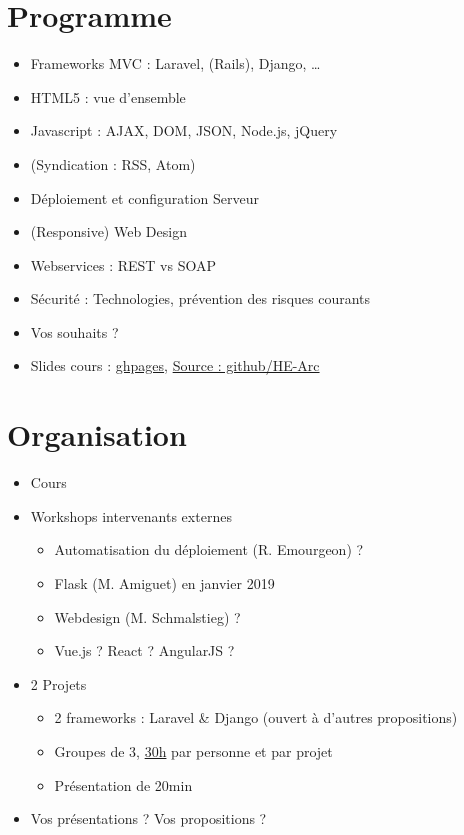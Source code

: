 \hypertarget{programme}{%
\section{Programme}\label{programme}}

\begin{itemize}
\tightlist
\item
  Frameworks MVC : Laravel, (Rails), Django, \ldots{}
\item
  HTML5 : vue d'ensemble
\item
  Javascript : AJAX, DOM, JSON, Node.js, jQuery
\item
  (Syndication : RSS, Atom)
\item
  Déploiement et configuration Serveur
\item
  (Responsive) Web Design
\item
  Webservices : REST vs SOAP
\item
  Sécurité : Technologies, prévention des risques courants
\item
  {Vos souhaits ?}
\item
  Slides cours :
  \href{https://he-arc.github.io/slides-devweb/}{ghpages},
  \href{https://github.com/HE-Arc/slides-devweb/tree/master/src}{Source
  : github/HE-Arc}
\end{itemize}

\hypertarget{organisation}{%
\section{Organisation}\label{organisation}}

\begin{itemize}
\tightlist
\item
  Cours
\item
  Workshops intervenants externes

  \begin{itemize}
  \tightlist
  \item
    Automatisation du déploiement (R. Emourgeon) ?
  \item
    Flask (M. Amiguet) en janvier 2019
  \item
    Webdesign (M. Schmalstieg) ?
  \item
    Vue.js ? React ? AngularJS ?
  \end{itemize}
\item
  2 Projets

  \begin{itemize}
  \tightlist
  \item
    2 frameworks : Laravel \& Django (ouvert à d'autres propositions)
  \item
    Groupes de 3,
    \href{https://www.he-arc.ch/sites/www.he-arc.ch/files/Reglements/04\%20Formation\%20de\%20base/43\%20Ing\%C3\%A9nierie/430.100\%20Descriptifs\%20de\%20modules\%20Informatique/RS430.100.18.3255\%20Technologies\%20d'interaction.pdf}{30h}
    par personne et par projet
  \item
    Présentation de 20min
  \end{itemize}
\item
  Vos présentations ? {Vos propositions ?}
\end{itemize}

